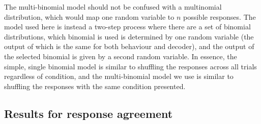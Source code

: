 The multi-binomial model should not be confused with a multinomial distribution, which would map one random variable to $n$ possible responses.
The model used here is instead a two-step process where there are a set of binomial distributions, which binomial is used is determined by one random variable (the output of which is the same for both behaviour and decoder), and the output of the selected binomial is given by a second random variable.
In essence, the simple, single binomial model is similar to shuffling the responses across all trials regardless of condition, and the multi-binomial model we use is similar to shuffling the responses with the same condition presented.


\subsection{Results for response agreement}


